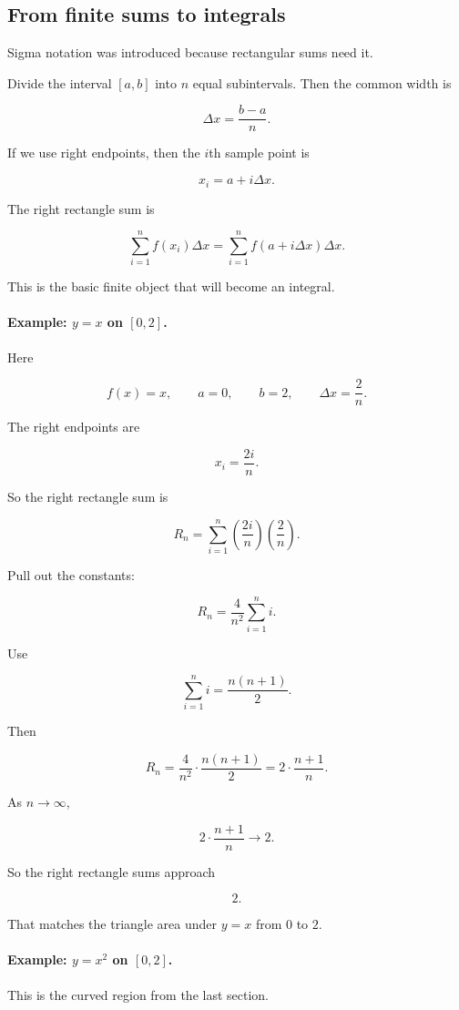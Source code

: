 \subsection{From finite sums to integrals}
\label{subsec:finite-sums-to-integrals}

Sigma notation was introduced because rectangular sums need it.

Divide the interval \([a,b]\) into \(n\) equal subintervals.  Then the common width is

\[
\Delta x=\frac{b-a}{n}.
\]

If we use right endpoints, then the \(i\)th sample point is

\[
x_i=a+i\Delta x.
\]

The right rectangle sum is

\[
\sum_{i=1}^{n} f(x_i)\Delta x
=
\sum_{i=1}^{n} f(a+i\Delta x)\Delta x.
\]

This is the basic finite object that will become an integral.

\paragraph{Example: \(y=x\) on \([0,2]\).}
Here

\[
f(x)=x,
\qquad
a=0,
\qquad
b=2,
\qquad
\Delta x=\frac{2}{n}.
\]

The right endpoints are

\[
x_i=\frac{2i}{n}.
\]

So the right rectangle sum is

\[
R_n
=
\sum_{i=1}^{n}
\left(\frac{2i}{n}\right)
\left(\frac{2}{n}\right).
\]

Pull out the constants:

\[
R_n
=
\frac{4}{n^2}\sum_{i=1}^{n} i.
\]

Use

\[
\sum_{i=1}^{n} i=\frac{n(n+1)}{2}.
\]

Then

\[
R_n
=
\frac{4}{n^2}\cdot \frac{n(n+1)}{2}
=
2\cdot \frac{n+1}{n}.
\]

As \(n\to\infty\),

\[
2\cdot \frac{n+1}{n}\to2.
\]

So the right rectangle sums approach

\[
2.
\]

That matches the triangle area under \(y=x\) from \(0\) to \(2\).

\paragraph{Example: \(y=x^2\) on \([0,2]\).}
This is the curved region from the last section.

